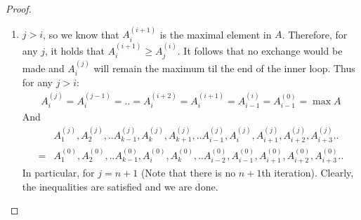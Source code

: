 \begin{proof}
\begin{enumerate}
\begin{enumerate}
        \item $j > i$, so we know that $A^{(i+1)}_{i}$ is the maximal element in $A$. Therefore, for any $j$, it holds that $A^{(i+1)}_{i}\ge A^{(i)}_{j}$. It follows that no exchange would be made and $A^{(j)}_{i}$ will remain the maximum til the end of the inner loop. Thus for any $j >i$:   
          \begin{equation*}
            \begin{split}
              A^{(j)}_{i}=A^{(j-1)}_{i}=.. =A^{(i+2)}_{i}=A^{(i+1)}_{i}=A^{(i)}_{i-1}=A^{(0)}_{i-1}=\max A
            \end{split}
          \end{equation*}
          And 
          \begin{equation*}
            \begin{split}
             & A^{(j)}_{1}, A^{(j)}_{2}, .. A^{(j)}_{k-1}, A^{(j)}_{k}, A^{(j)}_{k+1}, .. A^{(j)}_{i-1}, A^{(j)}_{i}, A^{(j)}_{i+1} , A^{(j)}_{i+2} , A^{(j)}_{i+3} .. \\
            = & A^{(0)}_{1}, A^{(0)}_{2}, .. A^{(0)}_{k-1}, A^{(0)}_{i}, A^{(0)}_{k}, .. A^{(0)}_{i-2}, A^{(0)}_{i-1}, A^{(0)}_{i+1} , A^{(0)}_{i+2} , A^{(0)}_{i+3} .. 
            \end{split}
          \end{equation*}
          In particular, for $j = n+1$ (Note that there is no $n+1$th iteration). Clearly, the inequalities are satisfied and we are done.
\end{enumerate}
\end{enumerate}
  \end{proof}
